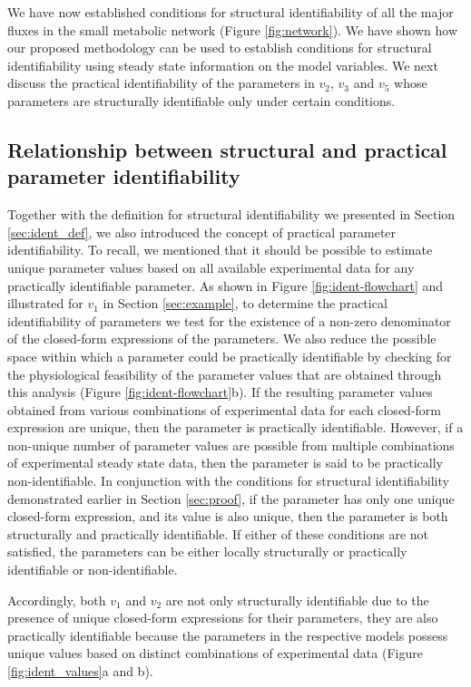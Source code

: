 \documentclass[10pt]{article}
\begin{document}
	We have now established conditions for structural identifiability of all the major fluxes in the small metabolic network (Figure \ref{fig:network}). We have shown how our proposed methodology can be used to establish conditions for structural identifiability using steady state information on the model variables. We next discuss the practical identifiability of the parameters in $v_2$, $v_3$ and $v_5$ whose parameters are structurally identifiable only under certain conditions. 
	
	\subsection{Relationship between structural and practical parameter identifiability}\label{sec:initial_analysis}
	Together with the definition for structural identifiability we presented in Section \ref{sec:ident_def}, we also introduced the concept of practical parameter identifiability. To recall, we mentioned that  it should be possible to estimate unique parameter values based on all available experimental data for any practically identifiable parameter. As shown in Figure \ref{fig:ident-flowchart} and illustrated for $v_1$ in Section \ref{sec:example}, to determine the practical identifiability of parameters we test for the existence of a non-zero denominator of the closed-form expressions of the parameters. We also reduce the possible space within which a parameter could be practically identifiable by checking for the physiological feasibility of the parameter values that are obtained through this analysis (Figure \ref{fig:ident-flowchart}b). If the resulting parameter values obtained from various combinations of experimental data for each closed-form expression are unique, then the parameter is practically identifiable. However, if a non-unique number of parameter values are possible from multiple combinations of experimental steady state data, then the parameter is said to be practically non-identifiable. In conjunction with the conditions for structural identifiability demonstrated earlier in Section \ref{sec:proof}, if the parameter has only one unique closed-form expression, and its value is also unique, then the parameter is both structurally and practically identifiable. If either of these conditions are not satisfied, the parameters can be either locally structurally or practically identifiable or non-identifiable.
	
	Accordingly, both $v_1$ and $v_2$ are not only structurally identifiable due to the presence of unique closed-form expressions for their parameters, they are also practically identifiable because the parameters in the respective models possess unique values based on distinct combinations of experimental data (Figure \ref{fig:ident_values}a and b). 
	
\end{document}
